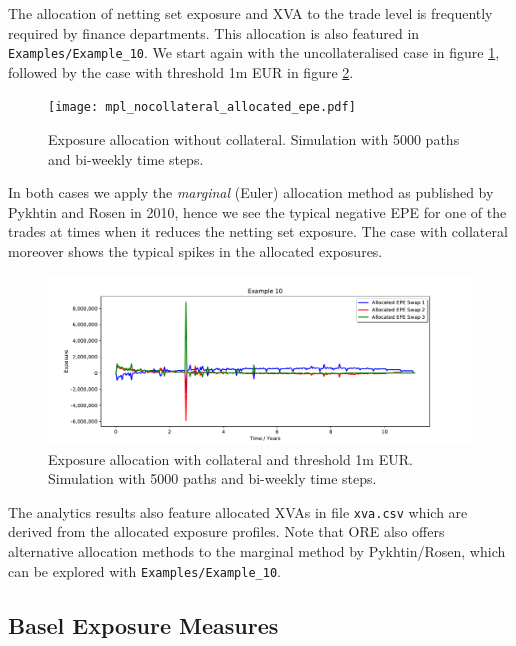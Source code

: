 \documentclass[12pt, a4paper]{article}
\begin{document}
\medskip The allocation of netting set exposure and XVA to the trade level is frequently required by finance
departments. This allocation is also featured in {\tt Examples/Example\_10}. We start again with the uncollateralised
case in figure \ref{fig_12}, followed by the case with threshold 1m EUR in figure \ref{fig_13}.
\begin{figure}[h!]
\begin{center}
\texttt{[image: mpl\_nocollateral\_allocated\_epe.pdf]}
\end{center}
\caption{Exposure allocation without collateral. Simulation with 5000 paths and bi-weekly time steps.}
\label{fig_12}
\end{figure}
In both cases we apply the {\em marginal} (Euler) allocation method as published by Pykhtin and Rosen in 2010, hence we
see the typical negative EPE for one of the trades at times when it reduces the netting set exposure. The case with
collateral moreover shows the typical spikes in the allocated exposures.
\begin{figure}[h!]
\begin{center}
\includegraphics[scale=0.45]{mpl_threshold_allocated_epe.pdf}
\end{center}
\caption{Exposure allocation with collateral and threshold 1m EUR. Simulation with 5000 paths and bi-weekly time steps.}
\label{fig_13}
\end{figure}
The analytics results also feature allocated XVAs in file {\tt xva.csv} which are derived from the allocated exposure
profiles. Note that ORE also offers alternative allocation methods to the marginal method by Pykhtin/Rosen, which can be
explored with {\tt Examples/Example\_10}.

\subsection{Basel Exposure Measures}\label{sec:basel}
\end{document}
